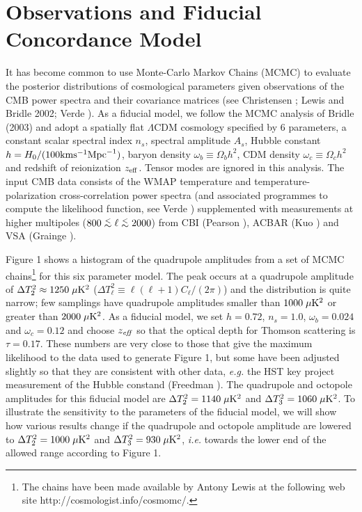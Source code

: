 \section{Observations and Fiducial Concordance Model}

It has become common to use Monte-Carlo Markov Chains (MCMC) to
evaluate the posterior distributions of cosmological parameters given
observations of the CMB power spectra and their covariance matrices
(see Christensen ; Lewis and Bridle 2002; Verde ). As a fiducial model, we follow the MCMC
analysis of Bridle \etals (2003) and adopt a
spatially flat $\Lambda$CDM cosmology specified by $6$ parameters, a
constant scalar spectral index $n_s$, spectral amplitude $A_s$, Hubble
constant $h = H_0/(100 {\rm km} {\rm s}^{-1} {\rm Mpc}^{-1})$, baryon
density $\omega_b \equiv \Omega_b h^2$, CDM density $\omega_c \equiv
\Omega_c h^2$ and redshift of reionization $z_{\rm eff}$. Tensor modes
are ignored in this analysis. The input CMB data consists of the WMAP
temperature and temperature-polarization cross-correlation power
spectra (and associated programmes to compute the likelihood function,
see Verde ) supplemented with  measurements at higher multipoles
($800 \simlt \ell \simlt 2000$) from CBI (Pearson ), ACBAR
(Kuo ) and VSA (Grainge ).

Figure 1 shows a histogram of the quadrupole amplitudes from a set of
MCMC chains\footnote{The chains have been made available by Antony
Lewis at the following web site http://cosmologist.info/cosmomc/.} for
this six parameter model. The peak occurs at a quadrupole
amplitude of $\Delta T^2_2 \approx 1250\; \mu {\rm K}^2$
($\Delta T^2_\ell \equiv \ell (\ell + 1) C_\ell/(2 \pi)$) and the distribution
is quite narrow;  few samplings have quadrupole amplitudes smaller than
$1000 \; \mu {\rm K}^2$ or greater than $2000 \; \mu {\rm K}^2$.
As a fiducial model, we set $h=0.72$, $n_s = 1.0$, $\omega_b = 0.024$
and $\omega_c = 0.12$ and choose $z_{\it eff}$ so that the optical
depth for Thomson scattering is $\tau = 0.17$. These numbers are very 
close to those that give the maximum likelihood to the data used to generate
Figure 1, but some have been adjusted slightly so that they are
consistent with other data, {\it e.g.} the HST key project measurement
of the Hubble constand (Freedman ). The quadrupole and octopole
amplitudes for this fiducial model are $\Delta T^2_2 = 1140 \; \mu {\rm K}^2$
and $\Delta T^2_3 = 1060 \; \mu {\rm K}^2$. To illustrate the sensitivity 
to the parameters of the fiducial model, we will show how various results
change if the quadrupole and octopole amplitude are lowered to 
$\Delta T^2_2 = 1000 \; \mu {\rm K}^2$ and $\Delta T^2_3 = 930 \; \mu {\rm K}^2$,
{\it i.e.} towards the lower end of the allowed range according to Figure 1.

